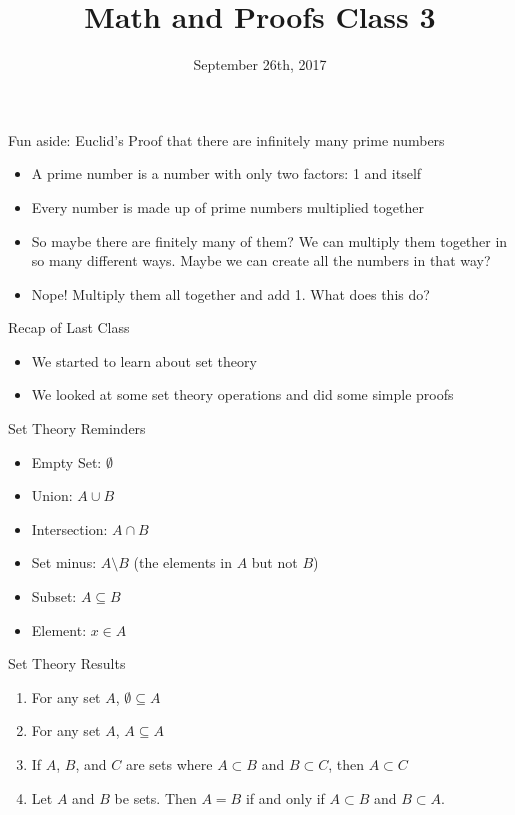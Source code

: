 \documentclass{beamer}
\begin{document}
\title[Math and Proofs]{Math and Proofs Class 3}
\date{September 26th, 2017}

\begin{frame}[plain]
\titlepage
\end{frame}

\begin{frame}{Fun aside: Euclid's Proof that there are infinitely many prime numbers}
\begin{itemize}
\item A prime number is a number with only two factors: 1 and itself
\item Every number is made up of prime numbers multiplied together
\item So maybe there are finitely many of them? We can multiply them together in so many different ways. Maybe we can create all the numbers in that way?
\item Nope! Multiply them all together and add 1. What does this do?
\end{itemize}
\end{frame}

\begin{frame}{Recap of Last Class}
\begin{itemize}
\item We started to learn about set theory
\item We looked at some set theory operations and did some simple proofs
\end{itemize}
\end{frame}

\begin{frame}{Set Theory Reminders}
\begin{itemize}
\item Empty Set: $\emptyset$
\item Union: $A\cup B$
\item Intersection: $A\cap B$
\item Set minus: $A\setminus B$ (the elements in $A$ but not $B$)
\item Subset: $A\subseteq B$
\item Element: $x\in A$
\end{itemize}
\end{frame}

\begin{frame}{Set Theory Results}
\begin{enumerate}
\item For any set $A$, $\emptyset \subseteq A$
\item For any set $A$, $A\subseteq A$
\item If $A$, $B$, and $C$ are sets where $A\subset B$ and $B\subset C$, then $A\subset C$
\item Let $A$ and $B$ be sets. Then $A=B$ if and only if $A\subset B$ and $B\subset A$.
\end{enumerate}
\end{frame}
\end{document}
